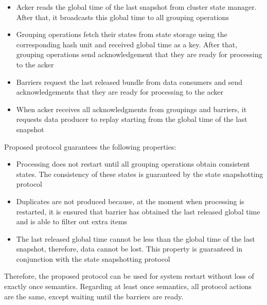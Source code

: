 \begin{itemize}
    \item Acker reads the global time of the last snapshot from cluster state manager. After that, it broadcasts this global time to all grouping operations
    \item Grouping operations fetch their states from state storage using the corresponding hash unit and received global time as a key. After that, grouping operations send acknowledgement that they are ready for processing to the acker 
    \item Barriers request the last released bundle from data consumers and send acknowledgements that they are ready for processing to the acker
    \item When acker receives all acknowledgments from groupings and barriers, it requests data producer to replay starting from the global time of the last snapshot  
\end{itemize}

Proposed protocol guarantees the following properties:

\begin{itemize}
    \item Processing does not restart until all grouping operations obtain consistent states. The consistency of these states is guaranteed by the state snapshotting protocol
    \item Duplicates are not produced because, at the moment when processing is restarted, it is ensured that barrier has obtained the last released global time and is able to filter out extra items
    \item The last released global time cannot be less than the global time of the last snapshot, therefore, data cannot be lost. This property is guaranteed in conjunction with the state snapshotting protocol
\end{itemize}

Therefore, the proposed protocol can be used for system restart without loss of exactly once semantics. Regarding at least once semantics, all protocol actions are the same, except waiting until the barriers are ready.
